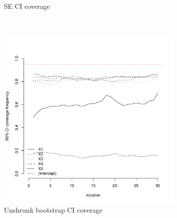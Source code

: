 \documentclass[authoryear, review, 11pt]{elsarticle}
\begin{document}
\begin{figure}
\begin{subfigure}[b]{0.45\textwidth}
		\caption{SE CI coverage}
	\end{subfigure}%
	\\%
	\begin{subfigure}[b]{0.45\textwidth}
	\centering
		\includegraphics[width=\textwidth]{../../figures/simulation/15.6.profile_unshrunk_bootstrap_coverage.pdf}
		\caption{Unshrunk bootstrap CI coverage}
	\end{subfigure}%
	~ %
	\begin{subfigure}[b]{0.45\textwidth}
	\centering

\end{subfigure}
\end{figure}
\end{document}

